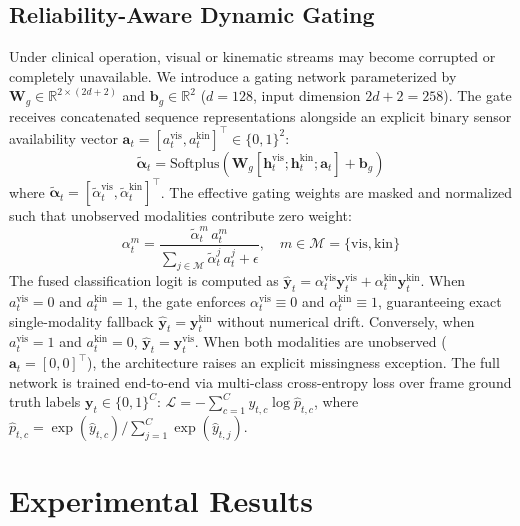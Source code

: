 \documentclass[10pt,journal]{IEEEtran}
\begin{document}
\subsection{Reliability-Aware Dynamic Gating}
Under clinical operation, visual or kinematic streams may become corrupted or completely unavailable. We introduce a gating network parameterized by $\mathbf{W}_g \in \mathbb{R}^{2 \times (2d+2)}$ and $\mathbf{b}_g \in \mathbb{R}^2$ ($d=128$, input dimension $2d+2=258$). The gate receives concatenated sequence representations alongside an explicit binary sensor availability vector $\mathbf{a}_t = [a_t^{\text{vis}}, a_t^{\text{kin}}]^\top \in \{0, 1\}^2$:
\begin{equation}
\tilde{\boldsymbol{\alpha}}_t = \text{Softplus}\left( \mathbf{W}_g [\mathbf{h}_t^{\text{vis}}; \mathbf{h}_t^{\text{kin}}; \mathbf{a}_t] + \mathbf{b}_g \right)
\end{equation}
where $\tilde{\boldsymbol{\alpha}}_t = [\tilde{\alpha}_t^{\text{vis}}, \tilde{\alpha}_t^{\text{kin}}]^\top$. The effective gating weights are masked and normalized such that unobserved modalities contribute zero weight:
\begin{equation}
\alpha_t^m = \frac{\tilde{\alpha}_t^m \, a_t^m}{\sum_{j \in \mathcal{M}} \tilde{\alpha}_t^j \, a_t^j + \epsilon}, \quad m \in \mathcal{M} = \{\text{vis}, \text{kin}\}
\end{equation}
The fused classification logit is computed as $\hat{\mathbf{y}}_t = \alpha_t^{\text{vis}} \mathbf{y}_t^{\text{vis}} + \alpha_t^{\text{kin}} \mathbf{y}_t^{\text{kin}}$.
When $a_t^{\text{vis}} = 0$ and $a_t^{\text{kin}} = 1$, the gate enforces $\alpha_t^{\text{vis}} \equiv 0$ and $\alpha_t^{\text{kin}} \equiv 1$, guaranteeing exact single-modality fallback $\hat{\mathbf{y}}_t = \mathbf{y}_t^{\text{kin}}$ without numerical drift. Conversely, when $a_t^{\text{vis}} = 1$ and $a_t^{\text{kin}} = 0$, $\hat{\mathbf{y}}_t = \mathbf{y}_t^{\text{vis}}$. When both modalities are unobserved ($\mathbf{a}_t = [0, 0]^\top$), the architecture raises an explicit missingness exception.
The full network is trained end-to-end via multi-class cross-entropy loss over frame ground truth labels $\mathbf{y}_t \in \{0, 1\}^C$: $\mathcal{L} = -\sum_{c=1}^C y_{t,c} \log \hat{p}_{t,c}$, where $\hat{p}_{t,c} = \exp(\hat{y}_{t,c}) / \sum_{j=1}^C \exp(\hat{y}_{t,j})$.

\section{Experimental Results}
\end{document}
